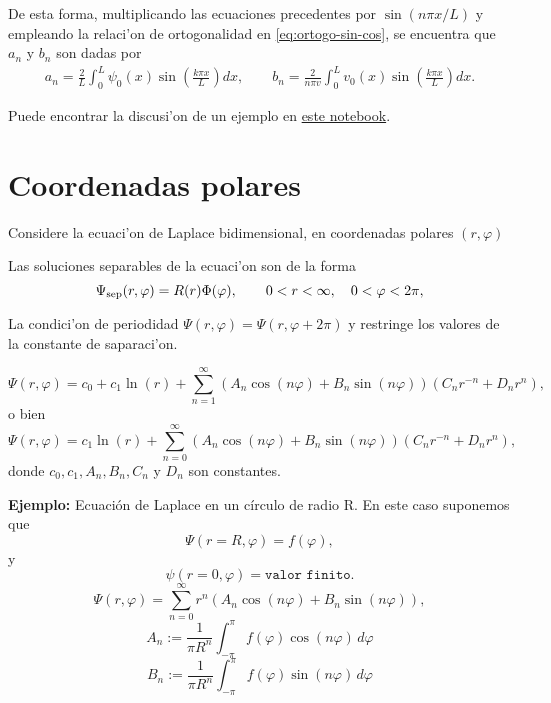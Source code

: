 De esta forma, multiplicando las ecuaciones precedentes por $\sin(n\pi x/L)$ y empleando la relaci'on de ortogonalidad en \eqref{eq:ortogo-sin-cos}, se encuentra que $a_{n}$ y $b_{n}$ son dadas por
\begin{align}
a_{n}=\frac{2}{L}\int_{0}^{L} \psi_{0}(x)\sin\left(\frac{k\pi x}{L}\right)dx, \qquad 
b_{n}=\frac{2}{n \pi v}\int_{0}^{L} v_{0}(x)\sin\left(\frac{k\pi x}{L}\right)dx.
\end{align}

Puede encontrar la discusi'on de un ejemplo en \href{https://github.com/gfrubi/FM2/blob/master/Notebooks/Ejemplo-MSV-Ecuacion-Onda-1D.ipynb}{este notebook}.

\section{Coordenadas polares}

Considere la ecuaci'on de Laplace bidimensional, en coordenadas polares $(r,\varphi)$

Las soluciones separables de la ecuaci'on son de la forma
\begin{equation}
\Psi_{\rm sep}(r,\varphi)=R(r)\Phi(\varphi), \qquad 0<r<\infty, \quad 0<\varphi<2\pi,
\end{equation}

La condici'on de periodidad $\Psi(r,\varphi)=\Psi(r,\varphi+2\pi)$ y restringe los valores de la constante de saparaci'on.

\begin{equation}
\Psi(r,\varphi)=c_0+c_1\ln(r)+\sum_{n=1}^\infty\left(A_n\cos(n\varphi)+B_n\sin(n\varphi)\right)
\left(C_nr^{-n}+D_nr^n\right),
\end{equation}
o bien
\begin{equation}
\Psi(r,\varphi)=c_1\ln(r)+\sum_{n=0}^\infty\left(A_n\cos(n\varphi)+B_n\sin(n\varphi)\right)
\left(C_nr^{-n}+D_nr^n\right),
\end{equation}
donde $c_0,c_1,A_n,B_n,C_n$ y $D_n$ son constantes.

\textbf{Ejemplo:} Ecuación de Laplace en un círculo de radio R. En este caso suponemos que
\begin{equation}
\Psi(r=R,\varphi)=f(\varphi),
\end{equation}
y 
\begin{equation}
\psi(r=0,\varphi) = \texttt{valor finito}.
\end{equation}
\begin{equation}
\Psi(r,\varphi)=\sum_{n=0}^\infty r^n\left(A_n\cos(n\varphi)+B_n\sin(n\varphi)\right),
\end{equation}
\begin{equation}
A_{n}:=\frac{1}{\pi R^{n}}\int_{-\pi}^{\pi}f(\varphi) \cos(n \varphi)\,d\varphi
\end{equation}
\begin{equation}
B_{n}:=\frac{1}{\pi R^{n}}\int_{-\pi}^{\pi}f(\varphi) \sin(n \varphi)\,d\varphi
\end{equation}

